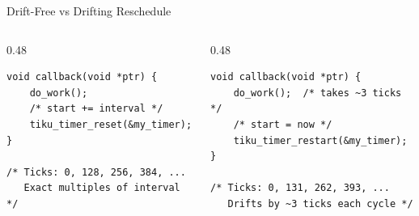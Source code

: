 \documentclass[aspectratio=169, 10pt]{beamer}
\begin{document}
\begin{frame}[fragile]{Drift-Free vs Drifting Reschedule}
\begin{columns}[T]
\begin{column}{0.48\textwidth}
\begin{lstlisting}[style=cstyle, title={Correct: no drift}]
void callback(void *ptr) {
    do_work();
    /* start += interval */
    tiku_timer_reset(&my_timer);
}

/* Ticks: 0, 128, 256, 384, ...
   Exact multiples of interval */
\end{lstlisting}

\begin{center}
\end{center}
\end{column}

\begin{column}{0.48\textwidth}
\begin{lstlisting}[style=cstyle, title={Wrong: cumulative drift}]
void callback(void *ptr) {
    do_work();  /* takes ~3 ticks */
    /* start = now */
    tiku_timer_restart(&my_timer);
}

/* Ticks: 0, 131, 262, 393, ...
   Drifts by ~3 ticks each cycle */
\end{lstlisting}

\begin{center}
\end{center}
\end{column}
\end{columns}
\end{frame}
\end{document}
